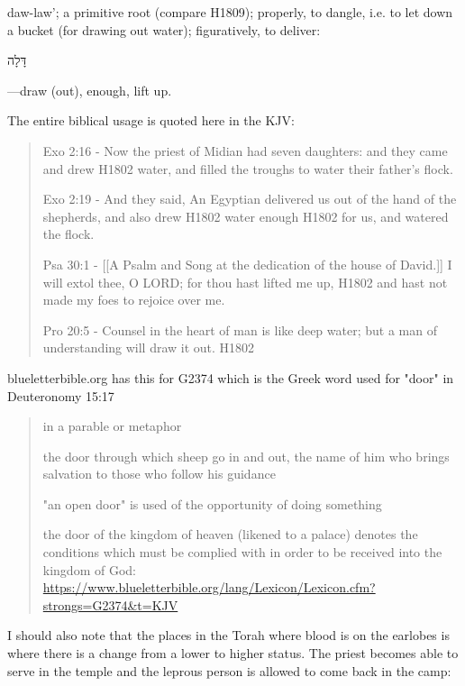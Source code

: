 \documentclass[11pt]{article}
\begin{document}
 daw-law'; a primitive root (compare H1809); properly, to dangle, i.e. to let down a bucket (for drawing out water); figuratively, to deliver:
 \begin{hebrew}
 דָּלָה        
 \end{hebrew}
—draw (out), enough, lift up.\newline

The entire biblical usage is quoted here in the KJV:
\begin{quote}
Exo 2:16 - Now the priest of Midian had seven daughters: and they came and drew H1802 water, and filled the troughs to water their father's flock.

Exo 2:19 - And they said, An Egyptian delivered us out of the hand of the shepherds, and also drew H1802 water enough H1802 for us, and watered the flock.

Psa 30:1 - [[A Psalm and Song at the dedication of the house of David.]] I will extol thee, O LORD; for thou hast lifted me up, H1802 and hast not made my foes to rejoice over me.

Pro 20:5 - Counsel in the heart of man is like deep water; but a man of understanding will draw it out. H1802
\end{quote}

blueletterbible.org has this for G2374 which is the Greek word used for "door" in Deuteronomy 15:17
\begin{quote}
in a parable or metaphor

the door through which sheep go in and out, the name of him who brings salvation to those who follow his guidance

"an open door" is used of the opportunity of doing something

the door of the kingdom of heaven (likened to a palace) denotes the conditions which must be complied with in order to be received into the kingdom of God:
\url{https://www.blueletterbible.org/lang/Lexicon/Lexicon.cfm?strongs=G2374&t=KJV}
\end{quote}

I should also note that the places in the Torah where blood is on the earlobes is where there is a change from a lower to higher status. The priest becomes able to serve in the temple and the leprous person is allowed to come back in the camp:
\end{document}
